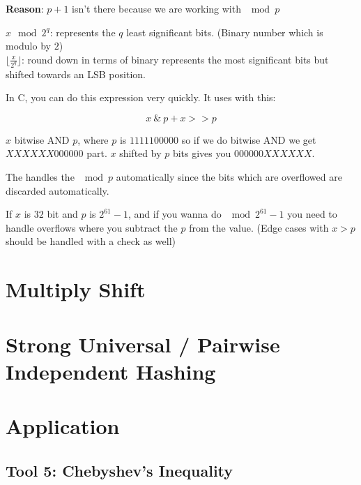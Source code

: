 \documentclass{article}
\begin{document}
\textbf{Reason}: $p+1$ isn't there because we are working with $\mod p$

$x \mod 2^q$: represents the $q$ least significant bits. (Binary number which is modulo by $2$) \\
$\lfloor\frac{x}{2^q}\rfloor$: round down in terms of binary represents the most significant bits but shifted towards an LSB position.

In C, you can do this expression very quickly. It uses  with this:

$$
x \: \& \: p + x >>p
$$

$x$ bitwise AND $p$, where $p$ is $1111100000$ so if we do bitwise AND we get $XXXXXX000000$ part. $x$ shifted by $p$ bits gives you $000000XXXXXX$. 

The  handles the $\mod p$ automatically since the bits which are overflowed are discarded automatically.

If $x$ is $32$ bit and $p$ is $2^{61} - 1$, and if you wanna do $\mod 2^{61} - 1$ you need to handle overflows where you subtract the $p$ from the value. (Edge cases with $x > p$ should be handled with a check as well)

\section{Multiply Shift}

\section{Strong Universal / Pairwise Independent Hashing}

\section{Application}

\subsection{Tool 5: Chebyshev's Inequality}






\end{document}
